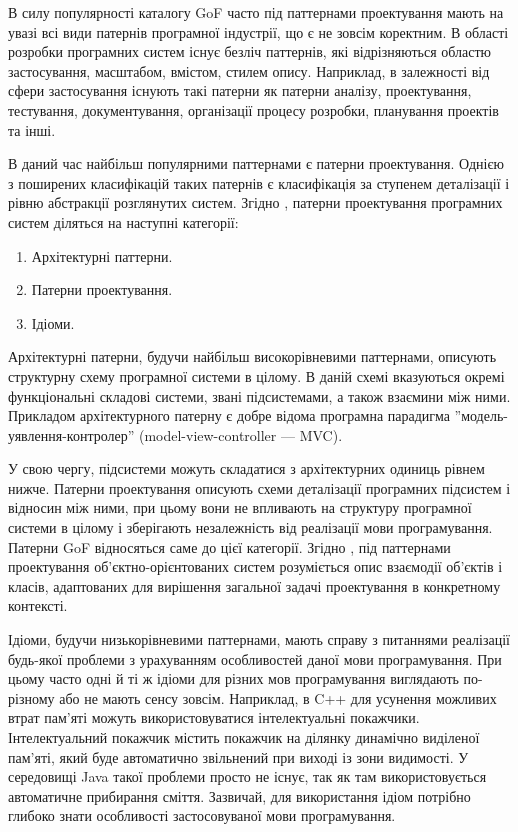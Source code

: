 \documentclass[../main.tex]{subfiles}
\begin{document}
		В силу популярності каталогу GoF \cite{gof} часто під паттернами проектування мають на увазі всі види патернів програмної індустрії, що є не зовсім коректним. В області розробки програмних систем існує безліч паттернів, які відрізняються областю застосування, масштабом, вмістом, стилем опису. Наприклад, в залежності від сфери застосування існують такі патерни як патерни аналізу, проектування, тестування, документування, організації процесу розробки, планування проектів та інші.~\cite{elemental_design_patterns}
		
		В даний час найбільш популярними паттернами є патерни проектування. Однією з поширених класифікацій таких патернів є класифікація за ступенем деталізації і рівню абстракції розглянутих систем. Згідно \cite{pattern_oriented_arch}, патерни проектування програмних систем діляться на наступні категорії:
		
		\begin{enumerate}
			\item Архітектурні паттерни.
			\item Патерни проектування.
			\item Ідіоми.
		\end{enumerate}
		
		Архітектурні патерни, будучи найбільш високорівневими паттернами, описують структурну схему програмної системи в цілому. В даній схемі вказуються окремі функціональні складові системи, звані підсистемами, а також взаємини між ними. Прикладом архітектурного патерну є добре відома програмна парадигма ''модель-уявлення-контролер'' (model-view-controller — MVC).
		
		У свою чергу, підсистеми можуть складатися з архітектурних одиниць рівнем нижче. Патерни проектування описують схеми деталізації програмних підсистем і відносин між ними, при цьому вони не впливають на структуру програмної системи в цілому і зберігають незалежність від реалізації мови програмування. Патерни GoF відносяться саме до цієї категорії. Згідно \cite{gof}, під паттернами проектування об'єктно-орієнтованих систем розуміється опис взаємодії об'єктів і класів, адаптованих для вирішення загальної задачі проектування в конкретному контексті.
		
		Ідіоми, будучи низькорівневими паттернами, мають справу з питаннями реалізації будь-якої проблеми з урахуванням особливостей даної мови програмування. При цьому часто одні й ті ж ідіоми для різних мов програмування виглядають по-різному або не мають сенсу зовсім. Наприклад, в C++ для усунення можливих втрат пам'яті можуть використовуватися інтелектуальні покажчики. Інтелектуальний покажчик містить покажчик на ділянку динамічно виділеної пам'яті, який буде автоматично звільнений при виході із зони видимості. У середовищі Java такої проблеми просто не існує, так як там використовується автоматичне прибирання сміття. Зазвичай, для використання ідіом потрібно глибоко знати особливості застосовуваної мови програмування.
		
\end{document}
